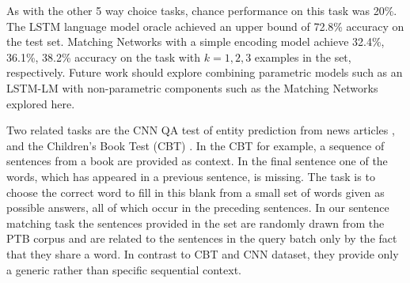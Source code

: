 As with the other 5 way choice tasks, chance performance on this task was 20\%.  The LSTM language model oracle achieved an upper bound of 72.8\% accuracy on the test set.  Matching Networks with a simple encoding model achieve 32.4\%, 36.1\%, 38.2\% accuracy on the task with $k=1,2,3$ examples in the set, respectively.  Future work should explore combining parametric models such as an LSTM-LM with non-parametric components such as the Matching Networks explored here.

Two related tasks are the CNN QA test of entity prediction from news articles \cite{hermann2015teaching}, and the Children's Book Test (CBT) \cite{hill2015goldilocks}.  In the CBT for example, a sequence of sentences from a book are provided as context.  In the final sentence one of the words, which has appeared in a previous sentence, is missing. The task is to choose the correct word to fill in this blank from a small set of words given as possible answers, all of which occur in the preceding sentences.  In our sentence matching task the sentences provided in the set are randomly drawn from the PTB corpus and are related to the sentences in the query batch only by the fact that they share a word. In contrast to CBT and CNN dataset, they provide only a generic rather than specific sequential context.